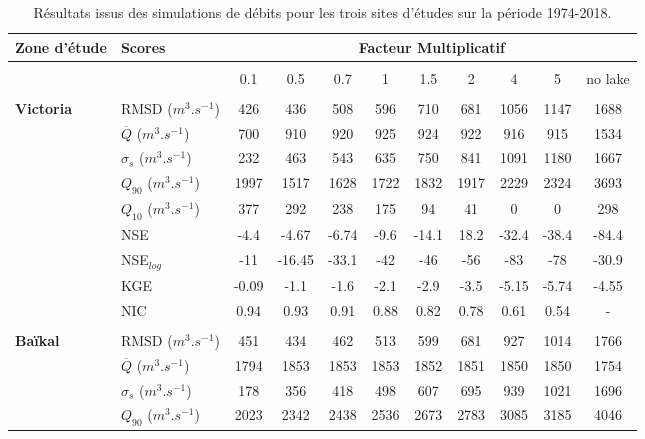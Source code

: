 \begin{table}[b!]
\caption{Résultats issus des simulations de débits pour les trois sites d'études sur la période 1974-2018.}
\footnotesize
\begin{tabular*}{\linewidth}{ @{\extracolsep{\fill}} ll *{9}c @{}}
\toprule
Zone d'étude & Scores & \multicolumn{9}{c}{Facteur Multiplicatif}\\
\midrule \midrule \addlinespace \\
 & & 0.1 & 0.5 & 0.7 & 1 & 1.5 & 2 & 4 & 5 & no lake\\
\cmidrule{3-11}
\addlinespace \\
\multirow{9}{*}{\textbf{Victoria}} & RMSD ($m^{3}.s^{-1}$)& 426 & 436 & 508 & 596 & 710 & 681 & 1056 & 1147 & 1688 \\
                         & $\overline{Q}$ ($m^{3}.s^{-1}$)& 700 & 910 & 920 & 925 & 924 & 922 & 916 & 915 & 1534   \\
                         & $\sigma_{s}$ ($m^{3}.s^{-1}$)& 232 & 463 & 543 & 635 & 750 & 841 & 1091 & 1180 & 1667 \\
                         & $Q_{90}$ ($m^{3}.s^{-1}$) & 1997 & 1517 & 1628 & 1722 & 1832 & 1917 & 2229 & 2324 & 3693 \\
                         & $Q_{10}$ ($m^{3}.s^{-1}$) & 377 & 292 & 238 & 175 & 94 & 41 & 0 & 0 & 298  \\
                         & NSE & -4.4 & -4.67 & -6.74 & -9.6 & -14.1 & 18.2 & -32.4 & -38.4 & -84.4\\
                         & NSE$_{log}$ & -11 & -16.45 & -33.1 & -42 & -46 & -56 & -83 & -78 & -30.9 \\
                         & KGE  & -0.09 & -1.1 & -1.6 & -2.1 & -2.9 & -3.5 & -5.15 & -5.74 & -4.55\\
                         & NIC &0.94&0.93&0.91&0.88&0.82&0.78&0.61&0.54&-\\
                         \midrule \addlinespace \\
\multirow{9}{*}{\textbf{Baïkal}} & RMSD ($m^{3}.s^{-1}$) & 451 & 434 & 462 & 513 & 599 & 681 & 927 & 1014 & 1766 \\
                         & $\overline{Q}$ ($m^{3}.s^{-1}$) & 1794 & 1853 & 1853 & 1853 & 1852 & 1851 & 1850 & 1850 & 1754  \\
                         & $\sigma_{s}$ ($m^{3}.s^{-1}$) & 178 & 356 & 418 & 498 & 607 & 695 & 939 & 1021 & 1696 \\
                         & $Q_{90}$ ($m^{3}.s^{-1}$) & 2023 & 2342 & 2438 & 2536 & 2673 & 2783 & 3085 & 3185 & 4046 \\

\end{tabular*}
\end{table}
